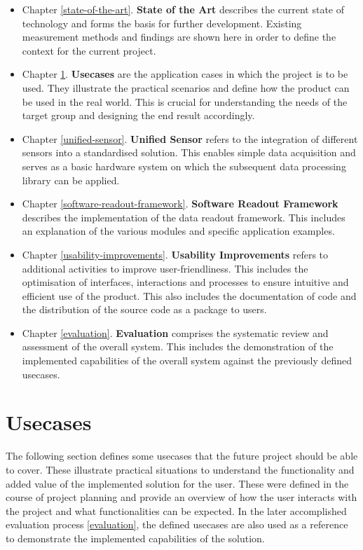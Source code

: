 \begin{itemize}
\item
  Chapter \ref{state-of-the-art}. \textbf{State of the Art} describes
  the current state of technology and forms the basis for further
  development. Existing measurement methods and findings are shown here
  in order to define the context for the current project.
\item
  Chapter \ref{usecases}. \textbf{Usecases} are the application cases in
  which the project is to be used. They illustrate the practical
  scenarios and define how the product can be used in the real world.
  This is crucial for understanding the needs of the target group and
  designing the end result accordingly.
\item
  Chapter \ref{unified-sensor}. \textbf{Unified Sensor} refers to the
  integration of different sensors into a standardised solution. This
  enables simple data acquisition and serves as a basic hardware system
  on which the subsequent data processing library can be applied.
\item
  Chapter \ref{software-readout-framework}. \textbf{Software Readout
  Framework} describes the implementation of the data readout framework.
  This includes an explanation of the various modules and specific
  application examples.
\item
  Chapter \ref{usability-improvements}. \textbf{Usability Improvements}
  refers to additional activities to improve user-friendliness. This
  includes the optimisation of interfaces, interactions and processes to
  ensure intuitive and efficient use of the product. This also includes
  the documentation of code and the distribution of the source code as a
  package to users.
\item
  Chapter \ref{evaluation}. \textbf{Evaluation} comprises the systematic
  review and assessment of the overall system. This includes the
  demonstration of the implemented capabilities of the overall system
  against the previously defined usecases.
\end{itemize}

\hypertarget{usecases}{%
\chapter{Usecases}\label{usecases}}

The following section defines some usecases that the future project
should be able to cover. These illustrate practical situations to
understand the functionality and added value of the implemented solution
for the user. These were defined in the course of project planning and
provide an overview of how the user interacts with the project and what
functionalities can be expected. In the later accomplished evaluation
process \ref{evaluation}, the defined usecases are also used as a
reference to demonstrate the implemented capabilities of the solution.

